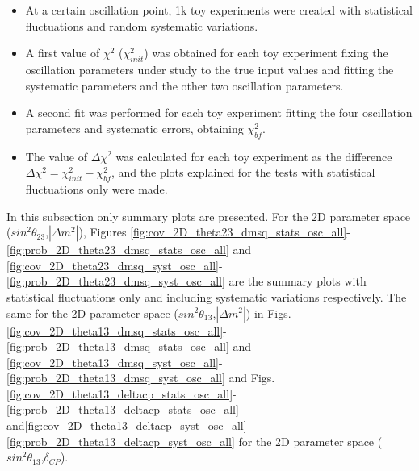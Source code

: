 \begin{itemize}
\item{At a certain oscillation point, 1k toy experiments were created with statistical fluctuations and random systematic variations.}
\item{A first value of $\chi^{2}$ ($\chi^{2} _{init}$) was obtained for each toy experiment fixing the oscillation parameters under study to the true input values and fitting the systematic parameters and the other two oscillation parameters.}
\item{A second fit was performed for each toy experiment fitting the four oscillation parameters and systematic errors, obtaining $\chi^{2} _{bf}$.}
\item{The value of $\Delta\chi^{2}$ was calculated for each toy experiment as the difference $\Delta\chi^{2} = \chi^{2}_{init} - \chi^{2}_{bf}$, and the plots explained for the tests with statistical fluctuations only were made.}
\end{itemize}

In this subsection only summary plots are presented. For the 2D parameter space ($sin^{2}\theta_{23}$,$|\Delta m^{2}|$),
Figures \ref{fig:cov_2D_theta23_dmsq_stats_osc_all}-\ref{fig:prob_2D_theta23_dmsq_stats_osc_all} and \ref{fig:cov_2D_theta23_dmsq_syst_osc_all}-\ref{fig:prob_2D_theta23_dmsq_syst_osc_all} are the summary plots with statistical fluctuations only and including systematic variations respectively. 
The same for the 2D parameter space ($sin^{2}\theta_{13}$,$|\Delta m^{2}|$) in Figs. \ref{fig:cov_2D_theta13_dmsq_stats_osc_all}-\ref{fig:prob_2D_theta13_dmsq_stats_osc_all} and \ref{fig:cov_2D_theta13_dmsq_syst_osc_all}-\ref{fig:prob_2D_theta13_dmsq_syst_osc_all} and Figs. \ref{fig:cov_2D_theta13_deltacp_stats_osc_all}-\ref{fig:prob_2D_theta13_deltacp_stats_osc_all} and\ref{fig:cov_2D_theta13_deltacp_syst_osc_all}-\ref{fig:prob_2D_theta13_deltacp_syst_osc_all} for the 2D parameter space ($sin^{2}\theta_{13}$,$\delta_{CP}$).

